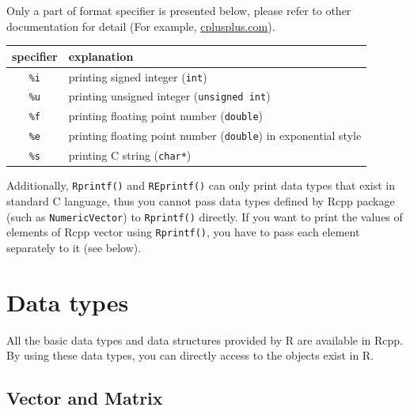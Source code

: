 \documentclass[]{book}
\newenvironment{Shaded}{\begin{snugshade}}{\end{snugshade}}
\newcommand{\CommentTok}[1]{\textcolor[rgb]{0.56,0.35,0.01}{\textit{#1}}}
\newcommand{\ControlFlowTok}[1]{\textcolor[rgb]{0.13,0.29,0.53}{\textbf{#1}}}
\newcommand{\DataTypeTok}[1]{\textcolor[rgb]{0.13,0.29,0.53}{#1}}
\newcommand{\DecValTok}[1]{\textcolor[rgb]{0.00,0.00,0.81}{#1}}
\newcommand{\NormalTok}[1]{#1}
\newcommand{\SpecialCharTok}[1]{\textcolor[rgb]{0.00,0.00,0.00}{#1}}
\newcommand{\StringTok}[1]{\textcolor[rgb]{0.31,0.60,0.02}{#1}}
\begin{document}
Only a part of format specifier is presented below, please refer to other documentation for detail (For example, \href{http://www.cplusplus.com/reference/cstdio/printf/}{cplusplus.com}).

\begin{longtable}[]{@{}cl@{}}
\toprule
specifier & explanation\tabularnewline
\midrule
\endhead
\texttt{\%i} & printing signed integer (\texttt{int})\tabularnewline
\texttt{\%u} & printing unsigned integer (\texttt{unsigned\ int})\tabularnewline
\texttt{\%f} & printing floating point number (\texttt{double})\tabularnewline
\texttt{\%e} & printing floating point number (\texttt{double}) in exponential style\tabularnewline
\texttt{\%s} & printing C string (\texttt{char*})\tabularnewline
\bottomrule
\end{longtable}

Additionally, \texttt{Rprintf()} and \texttt{REprintf()} can only print data types that exist in standard C language, thus you cannot pass data types defined by Rcpp package (such as \texttt{NumericVector}) to \texttt{Rprintf()} directly. If you want to print the values of elements of Rcpp vector using \texttt{Rprintf()}, you have to pass each element separately to it (see below).

\begin{Shaded}
\end{Shaded}

\hypertarget{data-types}{%
\chapter{Data types}\label{data-types}}

All the basic data types and data structures provided by R are available in Rcpp. By using these data types, you can directly access to the objects exist in R.

\hypertarget{vector-and-matrix}{%
\section{Vector and Matrix}\label{vector-and-matrix}}
\end{document}
